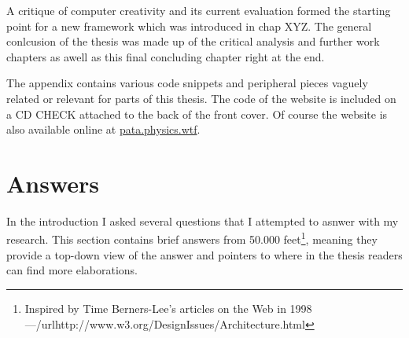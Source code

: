 A critique of computer creativity and its current evaluation formed the starting point for a new framework which was introduced in chap XYZ. The general conlcusion of the thesis was made up of the critical analysis and further work chapters as awell as this final concluding chapter right at the end.

The appendix contains various code snippets and peripheral pieces vaguely related or relevant for parts of this thesis. The code of the website is included on a CD CHECK attached to the back of the front cover. Of course the website is also available online at \url{pata.physics.wtf}.



\section{Answers}
\label{s:answers}

In the introduction I asked several questions that I attempted to asnwer with my research. This section contains brief answers from 50.000 feet\footnote{Inspired by Time Berners-Lee's articles on the Web in 1998---/url{http://www.w3.org/DesignIssues/Architecture.html}}, meaning they provide a top-down view of the answer and pointers to where in the thesis readers can find more elaborations.


